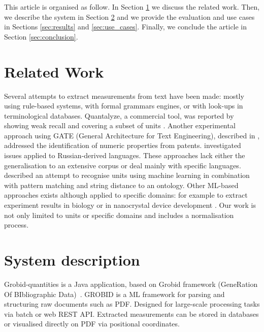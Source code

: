\documentclass[sigconf]{acmart}
\begin{document}
This article is organised as follow. In Section \ref{sec:related_work} we discuss the related work. Then, we describe the system in Section \ref{sec:system} and we provide the evaluation and use cases in Sections \ref{sec:results} and \ref{sec:use_cases}. Finally, we conclude the article in Section \ref{sec:conclusion}.

\section{Related Work}
\label{sec:related_work}
Several attempts to extract measurements from text have been made: mostly using rule-based systems, with formal grammars engines, or with look-ups in terminological databases. Quantalyze, a commercial tool, was reported by  \cite{hundman2017measurement} showing weak recall and covering a subset of units \cite{aras2014applications}. Another experimental approach using GATE (General Architecture for Text Engineering), described in \cite{agatonovic2008large}, addressed the identification of numeric properties from patents. \cite{am2013processing} investigated issues applied to Russian-derived languages. These approaches lack either the generalisation to an extensive corpus or deal mainly with specific languages. \cite{berrahou2013extract} described an attempt to recognise units using machine learning in combination with pattern matching and string distance to an ontology. Other ML-based approaches exists although applied to specific domains: for example to extract experiment results in biology \cite{kang_extracting_2013} or in nanocrystal device development \cite{dieb2015framework}. Our work is not only limited to units or specific domains and includes a normalisation process. 

\section{System description}
\label{sec:system}
Grobid-quantities is a Java application, based on Grobid framework (GeneRation Of BIbliographic Data)~\cite{GROBID}. GROBID is a ML framework for parsing and structuring raw documents such as PDF. Designed for large-scale processing tasks via batch or web REST API. Extracted measurements can be stored in databases or visualised directly on PDF via positional coordinates.
\end{document}
